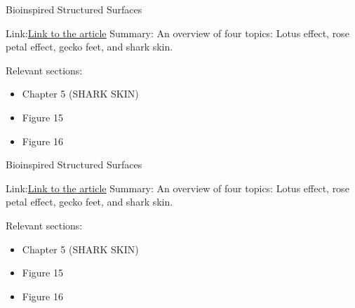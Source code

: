 \documentclass[preprint, letterpaper, nobibnotes, aps, superscriptaddress,prb]{revtex4-1}
\begin{document}
\begin{section}{Bioinspired Structured Surfaces}

Link:\href{https://pubs.acs.org/doi/pdf/10.1021/la2043729}{Link to the article}
Summary: An overview of four topics: Lotus effect, rose petal effect, gecko feet, and shark skin.

Relevant sections:
\begin{itemize}
	\item Chapter 5 (SHARK SKIN)
	\item Figure 15
	\item Figure 16
\end{itemize}
\end{section}


\begin{section}{Bioinspired Structured Surfaces}

Link:\href{https://pubs.acs.org/doi/pdf/10.1021/la2043729}{Link to the article}
Summary: An overview of four topics: Lotus effect, rose petal effect, gecko feet, and shark skin.

Relevant sections:
\begin{itemize}
	\item Chapter 5 (SHARK SKIN)
	\item Figure 15
	\item Figure 16
\end{itemize}
\end{section}
\end{document}
